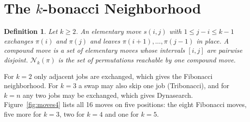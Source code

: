 \documentclass[letterpaper]{article} %
\newtheorem{definition}{Definition}
\theoremstyle{definition}
\newcommand{\N}{\mathcal{N}}
\begin{document}
\section{The $k$-bonacci Neighborhood}

\begin{definition}
Let $k\geq 2$. An \emph{elementary move} $s(i,j)$ with $1\leq j-i\leq k-1$
exchanges $\pi(i)$ and $\pi(j)$ and leaves $\pi(i+1),\dots,\pi(j-1)$ in
place. A \emph{compound move} is a set of elementary moves whose
intervals $[i,j]$ are pairwise disjoint. $\N_k(\pi)$ is the set of
permutations reachable by one compound move.
\end{definition}

For $k=2$ only adjacent jobs are exchanged, which gives the Fibonacci
neighborhood. For $k=3$ a swap may also skip one job (Tribonacci), and for
$k=n$ any two jobs may be exchanged, which gives Dynasearch.
Figure~\ref{fig:moves4} lists all 16 moves on five positions: the
eight Fibonacci moves, five more for $k=3$, two for $k=4$ and one for
$k=5$.
\end{document}
